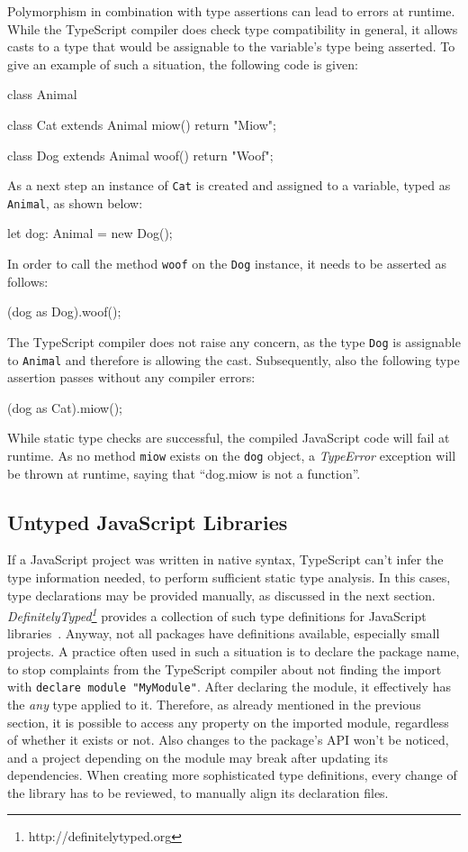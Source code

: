 Polymorphism in combination with type assertions can lead to errors at runtime. While the TypeScript compiler does check type compatibility in general, it allows casts to a type that would be assignable to the variable's type being asserted. To give an example of such a situation, the following code is given:
\begin{JsCode}[numbers=none]
class Animal { }

class Cat extends Animal {
  miow() {
    return "Miow";
  }
}

class Dog extends Animal {
  woof() {
    return "Woof";
  }
}
\end{JsCode}
As a next step an instance of \texttt{Cat} is created and assigned to a variable, typed as \texttt{Animal}, as shown below:
\begin{JsCode}[numbers=none]
let dog: Animal = new Dog();
\end{JsCode}
In order to call the method \texttt{woof} on the \texttt{Dog} instance, it needs to be asserted as follows:
\begin{JsCode}[numbers=none]
(dog as Dog).woof();
\end{JsCode}
The TypeScript compiler does not raise any concern, as the type \texttt{Dog} is assignable to \texttt{Animal} and therefore is allowing the cast. Subsequently, also the following type assertion passes without any compiler errors:
\begin{JsCode}[numbers=none]
(dog as Cat).miow();
\end{JsCode}
While static type checks are successful, the compiled JavaScript code will fail at runtime. As no method \texttt{miow} exists on the \texttt{dog} object, a \emph{TypeError} exception will be thrown at runtime, saying that ``dog.miow is not a function''.

\subsection{Untyped JavaScript Libraries}

If a JavaScript project was written in native syntax, TypeScript can't infer the type information needed, to perform sufficient static type analysis. In this cases, type declarations may be provided manually, as discussed in the next section. \emph{DefinitelyTyped\footnote{http://definitelytyped.org}} provides a collection of such type definitions for JavaScript libraries~\cite{DefinitelyTyped}. Anyway, not all packages have definitions available, especially small projects. A practice often used in such a situation is to declare the package name, to stop complaints from the TypeScript compiler about not finding the import with \texttt{declare module "MyModule"}.
After declaring the module, it effectively has the \emph{any} type applied to it. Therefore, as already mentioned in the previous section, it is possible to access any property on the imported module, regardless of whether it exists or not. Also changes to the package's API won't be noticed, and a project depending on the module may break after updating its dependencies. When creating more sophisticated type definitions, every change of the library has to be reviewed, to manually align its declaration files.

